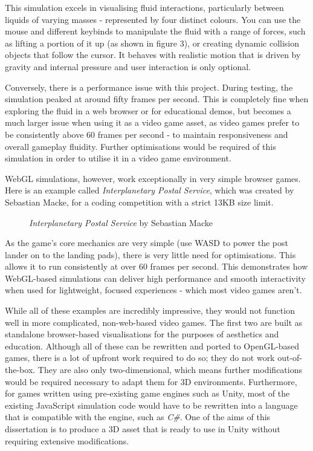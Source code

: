 \documentclass[12pt]{article}
\newcommand{\wideimage}[2][]{%
  \makebox[\textwidth][c]{\texttt{[image: \#2]}}%
}
\begin{document}
    This simulation excels in visualising fluid interactions, particularly between liquids of varying masses - represented by four distinct colours. You can use the mouse and different keybinds to manipulate the fluid with a range of forces, such as lifting a portion of it up (as shown in figure 3), or creating dynamic collision objects that follow the cursor. It behaves with realistic motion that is driven by gravity and internal pressure and user interaction is only optional.

    Conversely, there is a performance issue with this project. During testing, the simulation peaked at around fifty frames per second. This is completely fine when exploring the fluid in a web browser or for educational demos, but becomes a much larger issue when using it as a video game asset, as video games prefer to be consistently above 60 frames per second - to maintain responsiveness and overall gameplay fluidity. Further optimisations would be required of this simulation in order to utilise it in a video game environment.

    WebGL simulations, however, work exceptionally in very simple browser games. Here is an example called \textit{Interplanetary Postal Service}\cite{ips}, which was created by Sebastian Macke, for a coding competition with a strict 13KB size limit.

    \begin{figure}[H]
        \wideimage[]{webGLIPS.png}
        \caption{\textit{Interplanetary Postal Service} by Sebastian Macke \cite{ips}}
    \end{figure}

    As the game's core mechanics are very simple (use WASD to power the post lander on to the landing pads), there is very little need for optimisations. This allows it to run consistently at over 60 frames per second. This demonstrates how WebGL-based simulations can deliver high performance and smooth interactivity when used for lightweight, focused experiences - which most video games aren't.

    While all of these examples are incredibly impressive, they would not function well in more complicated, non-web-based video games. The first two are built as standalone browser-based visualisations for the purposes of aesthetics and education. Although all of these can be rewritten and ported to OpenGL-based games, there is a lot of upfront work required to do so; they do not work out-of-the-box. They are also only two-dimensional, which means further modifications would be required necessary to adapt them for 3D environments. Furthermore, for games written using pre-existing game engines such as Unity, most of the existing JavaScript simulation code would have to be rewritten into a language that is compatible with the engine, such as \textit{C\#}. One of the aims of this dissertation is to produce a 3D asset that is ready to use in Unity without requiring extensive modifications.
\end{document}

